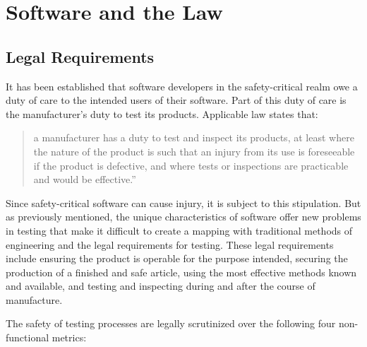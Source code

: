 \chapter{Software and the Law}

\section{Legal Requirements}

It has been established that software developers in the safety-critical realm
owe a duty of care to the intended users of their software. Part of this duty
of care is the manufacturer's duty to test its products. Applicable law states
that:

\begin{quote}
a manufacturer has a duty to test and inspect its products, at least where the
nature of the product is such that an injury from its use is foreseeable if the
product is defective, and where tests or inspections are practicable and would
be effective.''
\end{quote}

Since safety-critical software can cause injury, it is subject to this
stipulation. But as previously mentioned, the unique characteristics of
software offer new problems in testing that make it difficult to create a
mapping with traditional methods of engineering and the legal requirements for
testing. These legal requirements include ensuring the product is operable for
the purpose intended, securing the production of a finished and safe article,
using the most effective methods known and available, and testing and
inspecting during and after the course of manufacture.

The safety of testing processes are legally scrutinized over the following four
non-functional metrics: 

